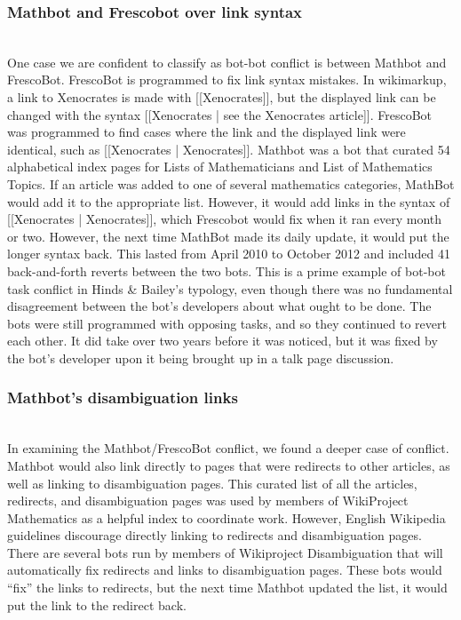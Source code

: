 \documentclass[format=acmsmall, review=false, screen=true]{acmart}%
\begin{document}
\subsubsection{Mathbot and Frescobot over link syntax}  
~\\
One case we are confident to classify as bot-bot conflict is between Mathbot and FrescoBot. FrescoBot is programmed to fix link syntax mistakes. In wikimarkup, a link to Xenocrates is made with [[Xenocrates]], but the displayed link can be changed with the syntax [[Xenocrates | see the Xenocrates article]]. FrescoBot was programmed to find cases where the link and the displayed link were identical, such as [[Xenocrates  | Xenocrates]]. Mathbot was a bot that curated 54 alphabetical index pages for Lists of Mathematicians and List of Mathematics Topics. If an article was added to one of several mathematics categories, MathBot would add it to the appropriate list. However, it would add links in the syntax of [[Xenocrates | Xenocrates]], which Frescobot would fix when it ran every month or two. However, the next time MathBot made its daily update, it would put the longer syntax back. This lasted from April 2010 to October 2012 and included 41 back-and-forth reverts between the two bots. This is a prime example of bot-bot task conflict in Hinds \& Bailey's typology, even though there was no fundamental disagreement between the bot's developers about what ought to be done. The bots were still programmed with opposing tasks, and so they continued to revert each other. It did take over two years before it was noticed, but it was fixed by the bot's developer upon it being brought up in a talk page discussion.  

\subsubsection{Mathbot's disambiguation links}
~\\
In examining the Mathbot/FrescoBot conflict, we found a deeper case of conflict. Mathbot would also link directly to pages that were redirects to other articles, as well as linking to disambiguation pages. This curated list of all the articles, redirects, and disambiguation pages was used by members of WikiProject Mathematics as a helpful index to coordinate work. However, English Wikipedia guidelines discourage directly linking to redirects and disambiguation pages. There are several bots run by members of Wikiproject Disambiguation that will automatically fix redirects and links to disambiguation pages. These bots would ``fix'' the links to redirects, but the next time Mathbot updated the list, it would put the link to the redirect back.
\end{document}
